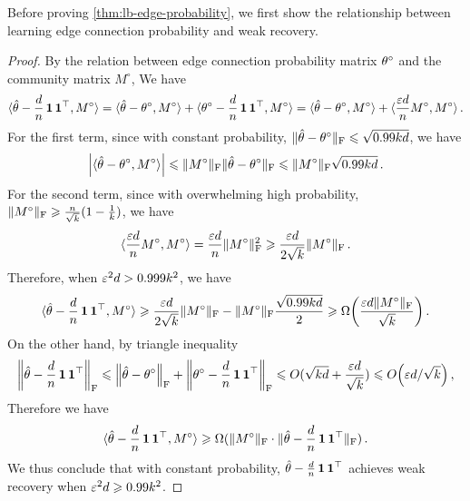 Before proving \cref{thm:lb-edge-probability}, we first show the relationship between learning edge connection probability and weak recovery.
\begin{proof}
By the relation between edge connection probability matrix $\theta^\circ$ and the community matrix $M^\circ$, We have
    \begin{equation*}
        \langle\hat{\theta}-\frac{d}{n}\operatorname{\mathbf 1} \operatorname{\mathbf 1}^\top,M^\circ\rangle=\langle\hat{\theta}-\theta^\circ,M^\circ\rangle+\langle\theta^\circ-\frac{d}{n}\operatorname{\mathbf 1} \operatorname{\mathbf 1}^\top,M^\circ\rangle=\langle\hat{\theta}-\theta^\circ,M^\circ\rangle+\langle\frac{\varepsilon d}{n}M^\circ,M^\circ\rangle\,.
    \end{equation*}
    For the first term, since with constant probability, $\lVert\hat{\theta}-\theta^\circ\rVert_{\mathrm{F}}\leqslant \sqrt{0.99kd}$, we have
    \begin{equation*}
      \Abs{\iprod{\hat{\theta}-\theta^\circ,M^\circ}}\leq \normf{M^\circ}\normf{\hat{\theta}-\theta^\circ}\leq 
        \normf{M^\circ} \sqrt{0.99kd}\,.
    \end{equation*}
    For the second term, since with overwhelming high probability, $\lVert M^\circ\rVert_{\mathrm{F}}\geqslant \frac{n}{\sqrt{k}}(1-\frac{1}{k})$, we have
    \begin{equation*}
        \langle\frac{\varepsilon d}{n}M^\circ,M^\circ\rangle=\frac{\varepsilon d}{n}\lVert M^\circ\rVert_{\mathrm{F}}^2\geqslant \frac{\varepsilon d }{2\sqrt{k}} \lVert M^\circ\rVert_{\mathrm{F}}\,.
    \end{equation*}
    Therefore, when $\varepsilon^2 d> 0.999 k^2$, we have 
    \begin{equation*}
        \iprod{\hat{\theta}-\frac{d}{n}\Ind \Ind^{\top},M^\circ}\geq \frac{\e d }{2\sqrt{k}} \normf{M^\circ}-\normf{M^\circ} \frac{\sqrt{0.99kd}}{2}\geq \Omega\Paren{\frac{\e d \normf{M^\circ}}{\sqrt{k}}} \,.
    \end{equation*}
    On the other hand, by triangle inequality
    \begin{equation*}
        \Normf{\hat{\theta}-\frac{d}{n}\Ind \Ind^{\top}}\leq  \Normf{\hat{\theta}-\theta^\circ}+ \Normf{\theta^\circ-\frac{d}{n}\Ind \Ind^{\top}}\leq O(\sqrt{kd}+\frac{\e d}{\sqrt{k}}) \leq O\Paren{\e d/\sqrt{k}}\,,
    \end{equation*}
Therefore we have 
\begin{equation*}
    \langle\hat{\theta}-\frac{d}{n}\operatorname{\mathbf 1} \operatorname{\mathbf 1}^{\top},M^\circ\rangle\geqslant \Omega(\lVert M^\circ\rVert_{\mathrm{F}}\cdot \lVert\hat{\theta}-\frac{d}{n}\operatorname{\mathbf 1} \operatorname{\mathbf 1}^{\top}\rVert_{\mathrm{F}})\,.
\end{equation*}
    We thus conclude that with constant probability, $\hat{\theta}-\frac{d}{n}\operatorname{\mathbf 1} \operatorname{\mathbf 1}^\top$ achieves weak recovery when $\varepsilon^2 d\geqslant 0.99k^2$.
\end{proof}
